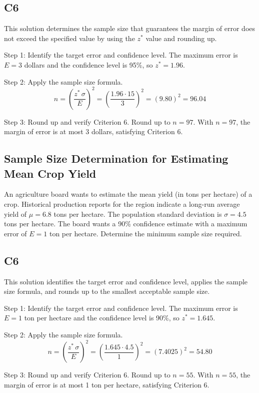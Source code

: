 \begin{ExamProblems}
		\subsection*{C6}
		This solution determines the sample size that guarantees the margin of error does not exceed the specified value by using the $z^*$ value and rounding up.
		
		Step 1: Identify the target error and confidence level. The maximum error is $E = 3$ dollars and the confidence level is 95\%, so $z^* = 1.96$.
		
		Step 2: Apply the sample size formula.
		\[
		n = \left(\frac{z^*\,\sigma}{E}\right)^2
		= \left(\frac{1.96 \cdot 15}{3}\right)^2
		= \left(9.80\right)^2
		= 96.04
		\]
		
		Step 3: Round up and verify Criterion 6. Round up to $n = 97$. With $n=97$, the margin of error is at most 3 dollars, satisfying Criterion 6.
		
		\item
		\subsection*{Sample Size Determination for Estimating Mean Crop Yield}
		An agriculture board wants to estimate the mean yield (in tons per hectare) of a crop. Historical production reports for the region indicate a long-run average yield of $\mu = 6.8$ tons per hectare. The population standard deviation is $\sigma = 4.5$ tons per hectare. The board wants a 90\% confidence estimate with a maximum error of $E = 1$ ton per hectare. Determine the minimum sample size required.
		
		\subsection*{C6}
		This solution identifies the target error and confidence level, applies the sample size formula, and rounds up to the smallest acceptable sample size.
		
		Step 1: Identify the target error and confidence level. The maximum error is $E = 1$ ton per hectare and the confidence level is 90\%, so $z^* = 1.645$.
		
		Step 2: Apply the sample size formula.
		\[
		n = \left(\frac{z^*\,\sigma}{E}\right)^2
		= \left(\frac{1.645 \cdot 4.5}{1}\right)^2
		= \left(7.4025\right)^2
		= 54.80
		\]
		
		Step 3: Round up and verify Criterion 6. Round up to $n = 55$. With $n=55$, the margin of error is at most 1 ton per hectare, satisfying Criterion 6.
		

\end{ExamProblems}

